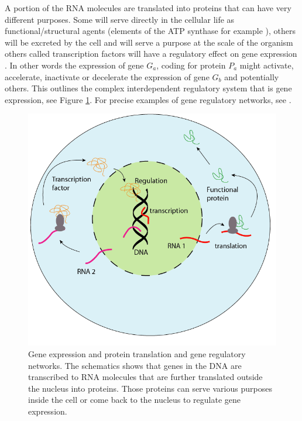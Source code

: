 	A portion of the RNA molecules are translated into proteins that can have very different purposes. Some will serve directly in the cellular life as functional/structural agents (elements of the ATP synthase for example \cite{boyer97}), others will be excreted by the cell and will serve a purpose at the scale of the organism \cite{kaiser84} others called transcription factors will have a regulatory effect on gene expression \cite{mitchell89}. In other words the expression of gene $G_a$, coding for protein $P_a$ might activate, accelerate, inactivate or decelerate the expression of gene $G_b$ and potentially others. This outlines the complex interdependent regulatory system that is gene expression, see Figure \ref{fig:cells}. For precise examples of gene regulatory networks, see \cite{gossen92, shinozaki03,fuqua01,balmer02}.\\
	
	
\begin{figure}[bth]
\begin{center}
  \includegraphics[width=0.8\linewidth]{gfx/chapter1/cell.png}
\end{center}
  \caption{Gene expression and protein translation and gene regulatory networks. The schematics shows that genes in the DNA are transcribed to RNA molecules that are further translated outside the nucleus into proteins. Those proteins can serve various purposes inside the cell or come back to the nucleus to regulate gene expression.}
  \label{fig:cells}
\end{figure}
	
	
	
